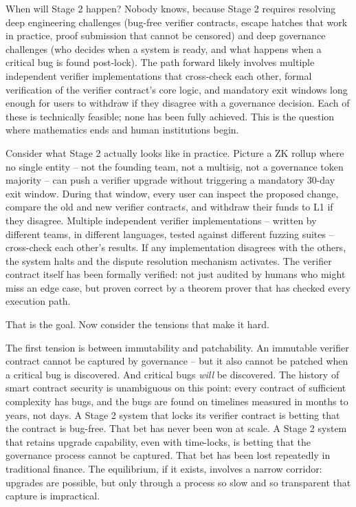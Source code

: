 \documentclass[
  11pt,
  openany]{report}
\begin{document}
When will Stage 2 happen? Nobody knows, because Stage 2 requires resolving deep
engineering challenges (bug-free verifier contracts, escape hatches that work in
practice, proof submission that cannot be censored) and deep governance
challenges (who decides when a system is ready, and what happens when a critical
bug is found post-lock). The path forward likely involves multiple independent
verifier implementations that cross-check each other, formal verification of the
verifier contract's core logic, and mandatory exit windows long enough for users
to withdraw if they disagree with a governance decision. Each of these is
technically feasible; none has been fully achieved. This is the question where
mathematics ends and human institutions begin.

Consider what Stage 2 actually looks like in practice. Picture a ZK rollup where
no single entity -- not the founding team, not a multisig, not a governance
token majority -- can push a verifier upgrade without triggering a mandatory
30-day exit window. During that window, every user can inspect the proposed
change, compare the old and new verifier contracts, and withdraw their funds to
L1 if they disagree. Multiple independent verifier implementations -- written by
different teams, in different languages, tested against different fuzzing suites
-- cross-check each other's results. If any implementation disagrees with the
others, the system halts and the dispute resolution mechanism activates. The
verifier contract itself has been formally verified: not just audited by humans
who might miss an edge case, but proven correct by a theorem prover that has
checked every execution path.

That is the goal. Now consider the tensions that make it hard.

The first tension is between immutability and patchability. An immutable
verifier contract cannot be captured by governance -- but it also cannot be
patched when a critical bug is discovered. And critical bugs \emph{will} be
discovered. The history of smart contract security is unambiguous on this point:
every contract of sufficient complexity has bugs, and the bugs are found on
timelines measured in months to years, not days. A Stage 2 system that locks its
verifier contract is betting that the contract is bug-free. That bet has never
been won at scale. A Stage 2 system that retains upgrade capability, even with
time-locks, is betting that the governance process cannot be captured. That bet
has been lost repeatedly in traditional finance. The equilibrium, if it exists,
involves a narrow corridor: upgrades are possible, but only through a process so
slow and so transparent that capture is impractical.
\end{document}
